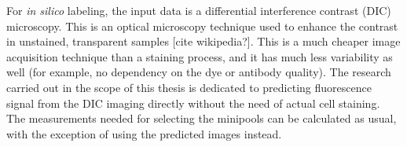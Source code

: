 For \textit{in silico} labeling, the input data is a differential interference contrast (DIC) microscopy. This is an optical microscopy technique used to enhance the contrast in unstained, transparent samples [cite wikipedia?]. This is a much cheaper image acquisition technique than a staining process, and it has much less variability as well (for example, no dependency on the dye or antibody quality). The research carried out in the scope of this thesis is dedicated to predicting fluorescence signal from the DIC imaging directly without the need of actual cell staining. The measurements needed for selecting the minipools can be calculated as usual, with the exception of using the predicted images instead.
